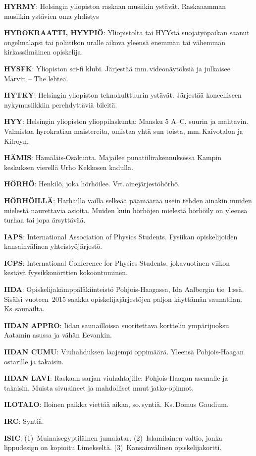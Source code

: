 \documentclass[../ala_hataile.tex]{subfiles}
\begin{document}
\textbf{HYRMY}: Helsingin yliopiston raskaan musiikin ystävät. Raskaaamman musiikin
ystävien oma yhdistys

\textbf{HYROKRAATTI, HYYPIÖ}: Yliopistolta
tai HYYstä suojatyöpaikan saanut
ongelmalapsi tai poliitikon uralle aikova
yleensä enemmän tai vähemmän kirkassilmäinen
opiskelija.

\textbf{HYSFK}: Yliopiston sci-fi klubi. Järjestää
mm.\,videonäytöksiä ja julkaisee Marvin --
The lehteä.

\textbf{HYTKY}: Helsingin yliopiston teknokulttuurin
ystävät. Järjestää koneelliseen nykymusiikkiin
perehdyttäviä bileitä.

\textbf{HYY}: Helsingin yliopiston ylioppilaskunta:
Mansku 5 A--C, suurin ja mahtavin.
Valmistaa hyrokratian maistereita, omistaa
yhtä sun toista, mm.\,Kaivotalon ja Kilroyn.

\textbf{HÄMIS}: Hämäläis-Osakunta. Majailee
punatiilirakennuksessa Kampin keskuksen
vierellä Urho Kekkosen kadulla.

\textbf{HÖRHÖ}: Henkilö, joka hörhöilee. Vrt.\,ainejärjestöhörhö.

\textbf{HÖRHÖILLÄ}: Harhailla vailla selkeää
päämäärää usein tehden ainakin muiden
mielestä naurettavia asioita. Muiden kuin
hörhöjen mielestä hörhöily on yleensä turhaa
tai jopa ärsyttävää.

\textbf{IAPS}: International Association of Physics
Students. Fysiikan opiskelijoiden kansainvälinen
yhteistyöjärjestö.

\textbf{ICPS}: International Conference for Physics
Students, jokavuotinen viikon kestävä
fyysikkonörttien kokoontuminen.

\textbf{IIDA}: Opiskelijakämppäläkiinteistö Pohjois-Haagassa, Ida Aalbergin tie~1:ssä.
Sisälsi vuoteen~2015 saakka opiskelijajärjestöjen
paljon käyttämän saunatilan. Ks.\,saunailta.

\textbf{IIDAN APPRO}: Iidan saunailloissa suoritettava
korttelin ympärijuoksu Aatamin
asussa ja vähän Eevankin.

\textbf{IIDAN CUMU}: Viuhahduksen laajempi
oppimäärä. Yleensä Pohjois-Haagan ostarille
ja takaisin.

\textbf{IIDAN LAVI}: Raskaan sarjan viuhahtajille:
Pohjois-Haagan asemalle ja takaisin.
Muista sivuaineet ja mahdolliset muut jatko-opinnot.

\textbf{ILOTALO}: Iloinen paikka viettää aikaa,
so.\,syntiä. Ks.\,Domus Gaudium.

\textbf{IRC}: Syntiä.

\textbf{ISIC}: (1)~Muinais\-egyptiläinen jumalatar. (2)~Islamilainen valtio, jonka lippu\-design on kopioitu Limekseltä. (3)~Kansainvälinen opiskelijakortti.
\end{document}
